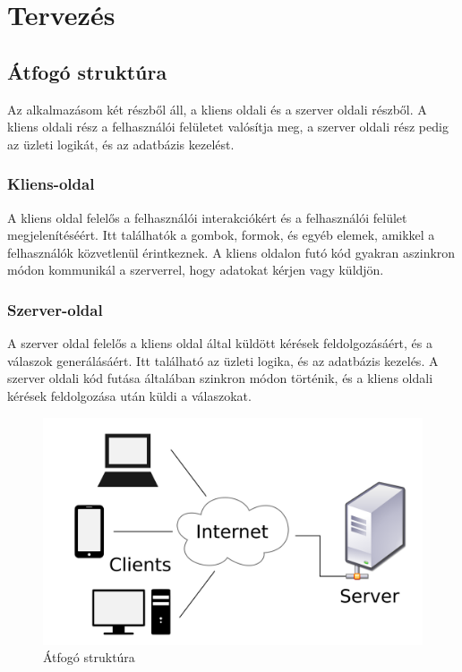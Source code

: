 \chapter{Tervez\'es}\label{chapter:tervezes}

\section*{Átfogó struktúra}
Az alkalmazásom két részből áll, a kliens oldali és a szerver oldali részből.
A kliens oldali rész a felhasználói felületet valósítja meg, a szerver oldali rész pedig az üzleti logikát, és az adatbázis kezelést.
\\
\subsection*{Kliens-oldal}
A kliens oldal felelős a felhasználói interakciókért és a felhasználói felület megjelenítéséért. Itt találhatók a gombok, formok, és egyéb elemek, amikkel a felhasználók közvetlenül érintkeznek. A kliens oldalon futó kód gyakran aszinkron módon kommunikál a szerverrel, hogy adatokat kérjen vagy küldjön.
\\
\subsection*{Szerver-oldal}
A szerver oldal felelős a kliens oldal által küldött kérések feldolgozásáért, és a válaszok generálásáért. Itt található az üzleti logika, és az adatbázis kezelés. A szerver oldali kód futása általában szinkron módon történik, és a kliens oldali kérések feldolgozása után küldi a válaszokat.
\begin{figure}[H]
    \centering
    \includegraphics[width=14.0truecm]{images/Client-server-model.png}
    \caption[Átfogó struktúra]{Átfogó struktúra \cite{architecture}}
    \label{fig:architecture}
\end{figure}

